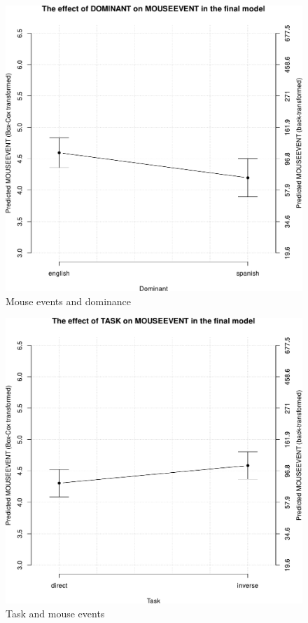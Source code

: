 \documentclass[output=paper]{langscibook}
\begin{document}
\begin{figure}
        \includegraphics[height=.45\textheight]{figures/Ferreira-Figure1.7.pdf}
        \caption{Mouse events and dominance\label{fig7h}}
\end{figure}

\begin{figure}
        \includegraphics[height=.45\textheight]{figures/Ferreira-Figure1.8.pdf}
        \caption{Task and mouse events\label{fig8h}}
\end{figure}
\end{document}
